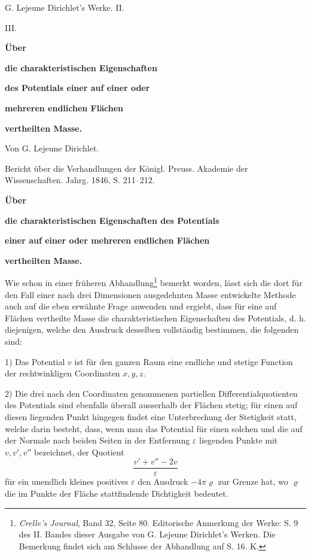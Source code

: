\documentclass[11pt]{article}
\begin{document}
\begin{center}
{\Large G. Lejeune Dirichlet's Werke. II.}\par\vspace{1.5em}
{\Large III.}\par\vspace{0.5em}
{\LARGE \textbf{Über}}\par
{\LARGE \textbf{die charakteristischen Eigenschaften}}\par
{\LARGE \textbf{des Potentials einer auf einer oder}}\par
{\LARGE \textbf{mehreren endlichen Flächen}}\par
{\LARGE \textbf{vertheilten Masse.}}\par\vspace{1em}
{\large Von G. Lejeune Dirichlet.}\par\vspace{0.5em}
{\small Bericht über die Verhandlungen der Königl. Preuss. Akademie der Wissenschaften. Jahrg. 1846, S. 211--212.}
\end{center}

\begin{center}
\textbf{Über}\par
\textbf{die charakteristischen Eigenschaften des Potentials}\par
\textbf{einer auf einer oder mehreren endlichen Flächen}\par
\textbf{vertheilten Masse.}
\end{center}

Wie schon in einer früheren Abhandlung\footnote{\emph{Crelle's Journal}, Band 32, Seite 80. Editorische Anmerkung der Werke: S. 9 des II. Bandes dieser Ausgabe von G. Lejeune Dirichlet's Werken. Die Bemerkung findet sich am Schlusse der Abhandlung auf S. 16. K.} bemerkt worden, lässt sich die dort für den Fall einer nach drei Dimensionen ausgedehnten Masse entwickelte Methode auch auf die eben erwähnte Frage anwenden und ergiebt, dass für eine auf Flächen vertheilte Masse die charakteristischen Eigenschaften des Potentials, d. h. diejenigen, welche den Ausdruck desselben vollständig bestimmen, die folgenden sind:

1) Das Potential $v$ ist für den ganzen Raum eine endliche und stetige Function der rechtwinkligen Coordinaten $x,y,z$.

2) Die drei nach den Coordinaten genommenen partiellen Differentialquotienten des Potentials sind ebenfalls überall ausserhalb der Flächen stetig; für einen auf diesen liegenden Punkt hingegen findet eine Unterbrechung der Stetigkeit statt, welche darin besteht, dass, wenn man das Potential für einen solchen und die auf der Normale nach beiden Seiten in der Entfernung $\varepsilon$ liegenden Punkte mit $v,v',v''$ bezeichnet, der Quotient
\[
\frac{v'+v''-2v}{\varepsilon}
\]
für ein unendlich kleines positives $\varepsilon$ den Ausdruck $-4\pi\varrho$ zur Grenze hat, wo $\varrho$ die im Punkte der Fläche stattfindende Dichtigkeit bedeutet.
\end{document}
